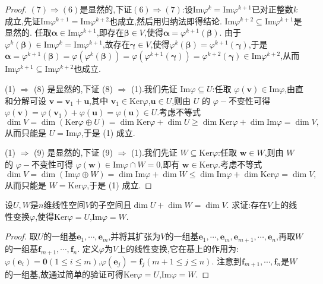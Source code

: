 \documentclass[../../main.tex]{subfiles}%
\begin{document}
\begin{proof}
\((7)\Rightarrow(6)\)是显然的,下证\((6)\Rightarrow(7)\):设\(\text{Im}\varphi^k=\text{Im}\varphi^{k + 1}\)已对正整数\(k\)成立,先证\(\text{Im}\varphi^{k + 1}=\text{Im}\varphi^{k + 2}\)也成立,然后用归纳法即得结论. \(\text{Im}\varphi^{k + 2}\subseteq\text{Im}\varphi^{k + 1}\)是显然的. 任取\(\boldsymbol{\alpha}\in\text{Im}\varphi^{k + 1}\),即存在\(\boldsymbol{\beta}\in V\),使得\(\boldsymbol{\alpha}=\varphi^{k + 1}(\boldsymbol{\beta})\). 由于\(\varphi^k(\boldsymbol{\beta})\in\text{Im}\varphi^k=\text{Im}\varphi^{k + 1}\),故存在\(\boldsymbol{\gamma}\in V\),使得\(\varphi^k(\boldsymbol{\beta})=\varphi^{k + 1}(\boldsymbol{\gamma})\),于是\(\boldsymbol{\alpha}=\varphi^{k + 1}(\boldsymbol{\beta})=\varphi(\varphi^k(\boldsymbol{\beta}))=\varphi(\varphi^{k + 1}(\boldsymbol{\gamma}))=\varphi^{k + 2}(\boldsymbol{\gamma})\in\text{Im}\varphi^{k + 2}\),从而\(\text{Im}\varphi^{k + 1}\subseteq\text{Im}\varphi^{k + 2}\)也成立.

(1) \(\Rightarrow\) (8) 是显然的,下证 (8) \(\Rightarrow\) (1).我们先证 \(\text{Im}\varphi\subseteq U\):任取 \(\varphi(\boldsymbol{v})\in\text{Im}\varphi\),由直和分解可设 \(\boldsymbol{v}=\boldsymbol{v}_1+\boldsymbol{u}\),其中 \(\boldsymbol{v}_1\in\text{Ker}\varphi\),\(\boldsymbol{u}\in U\),则由 \(U\) 的 \(\varphi -\)不变性可得 \(\varphi(\boldsymbol{v})=\varphi(\boldsymbol{v}_1)+\varphi(\boldsymbol{u})=\varphi(\boldsymbol{u})\in U\).考虑不等式
\[
\dim V=\dim(\text{Ker}\varphi\oplus U)=\dim\text{Ker}\varphi+\dim U\geqslant \dim\text{Ker}\varphi+\dim\text{Im}\varphi=\dim V,
\]
从而只能是 \(U = \text{Im}\varphi\),于是 (1) 成立.

(1) \(\Rightarrow\) (9) 是显然的,下证 (9) \(\Rightarrow\) (1).我们先证 \(W\subseteq\text{Ker}\varphi\):任取 \(\boldsymbol{w}\in W\),则由 \(W\) 的 \(\varphi -\)不变性可得 \(\varphi(\boldsymbol{w})\in\text{Im}\varphi\cap W = 0\),即有 \(\boldsymbol{w}\in\text{Ker}\varphi\).考虑不等式
\[
\dim V=\dim(\text{Im}\varphi\oplus W)=\dim\text{Im}\varphi+\dim W\leqslant \dim\text{Im}\varphi+\dim\text{Ker}\varphi=\dim V,
\]
从而只能是 \(W = \text{Ker}\varphi\),于是 (1) 成立.
\end{proof}

\begin{proposition}\label{proposition:由维数公式得到线性映射的存在性}
设\(U,W\)是\(n\)维线性空间\(V\)的子空间且\(\dim U+\dim W=\dim V\). 求证:存在\(V\)上的线性变换\(\varphi\),使得\(\text{Ker}\varphi = U\),\(\text{Im}\varphi = W\).
\end{proposition}
\begin{proof}
取\(U\)的一组基\(\boldsymbol{e}_1,\cdots,\boldsymbol{e}_m\),并将其扩张为\(V\)的一组基\(\boldsymbol{e}_1,\cdots,\boldsymbol{e}_m,\boldsymbol{e}_{m + 1},\cdots,\boldsymbol{e}_n\),再取\(W\)的一组基\(\boldsymbol{f}_{m + 1},\cdots,\boldsymbol{f}_n\). 定义\(\varphi\)为\(V\)上的线性变换,它在基上的作用为:\(\varphi(\boldsymbol{e}_i)=\boldsymbol{0}(1\leqslant  i\leqslant  m)\),\(\varphi(\boldsymbol{e}_j)=\boldsymbol{f}_j(m + 1\leqslant  j\leqslant  n)\). 注意到\(\boldsymbol{f}_{m + 1},\cdots,\boldsymbol{f}_n\)是\(W\)的一组基,故通过简单的验证可得\(\text{Ker}\varphi = U\),\(\text{Im}\varphi = W\). 
\end{proof}
\end{document}
